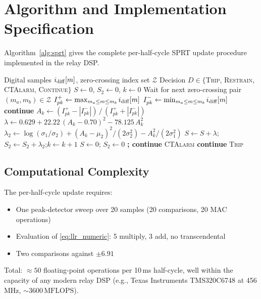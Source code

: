 \documentclass[11pt, a4paper]{article}
\begin{document}
\section{Algorithm and Implementation Specification}
\label{sec:algorithm}

Algorithm~\ref{alg:sprt} gives the complete per-half-cycle SPRT update
procedure implemented in the relay DSP.

\begin{algorithm}[!t]
\caption{Per-Half-Cycle SPRT Update (50\,Hz System, $f_s = 1$\,kHz)}
\label{alg:sprt}
\begin{algorithmic}[1]
\Require Digital samples $i_{\rm diff}[m]$, zero-crossing index set $\mathcal{Z}$
\Ensure Decision $D \in \{$\textsc{Trip}, \textsc{Restrain}, \textsc{CTAlarm}, \textsc{Continue}$\}$
\State $S \gets 0$, $S_2 \gets 0$, $k \gets 0$
  \State Wait for next zero-crossing pair $(m_a, m_b) \in \mathcal{Z}$
  \State $I^+_{pk} \gets \max_{m_a \leq m \leq m_b} i_{\rm diff}[m]$
  \State $I^-_{pk} \gets \min_{m_a \leq m \leq m_b} i_{\rm diff}[m]$
   \textbf{continue} \EndIf
  \State $A_k \gets (I^+_{pk} - |I^-_{pk}|)\,/\,(I^+_{pk} + |I^-_{pk}|)$
  \State $\lambda \gets 0.629 + 22.22\,(A_k - 0.70)^2 - 78.125\,A_k^2$
  \State $\lambda_2 \gets \log(\sigma_1/\sigma_2) + (A_k-\mu_2)^2/(2\sigma_2^2) - A_k^2/(2\sigma_1^2)$
  \State $S \gets S + \lambda$;\quad $S_2 \gets S_2 + \lambda_2$;\quad $k \gets k + 1$
   $S \gets 0$; $S_2 \gets 0$ \textbf{; continue}
    \EndIf
   \Return \textsc{CTAlarm}
    \EndIf
   \textbf{continue}
    \EndIf
   \Return \textsc{Trip}
    \EndIf
\EndWhile
\end{algorithmic}
\end{algorithm}

\subsection{Computational Complexity}

The per-half-cycle update requires:
\begin{itemize}
  \item One peak-detector sweep over 20 samples (20 comparisons, 20 MAC operations)
  \item Evaluation of \eqref{eq:llr_numeric}: 5 multiply, 3 add, no transcendental
  \item Two comparisons against $\pm 6.91$
\end{itemize}
Total: $\approx 50$ floating-point operations per 10\,ms half-cycle, well within
the capacity of any modern relay DSP (e.g., Texas Instruments TMS320C6748 at
456\,MHz, $\sim 3600\,\text{MFLOPS}$).
\end{document}
